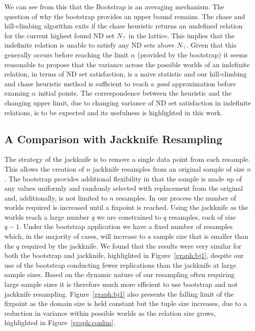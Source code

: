 We can see from this that the Bootstrap is an averaging mechanism.
The question of why the bootstrap provides an upper bound remains.
The chase and hill-climbing algorithm exits if the chase heuristic
returns an undefined relation for the current highest found ND set
$N_{\top}$ in
the lattice. This implies that the indefinite relation is unable to
satisfy any ND sets above $N_{\top}$. Given that this generally occurs
before reaching the limit $\alpha$ (provided by the bootstrap) it
seems reasonable to propose that the variance across the possible
worlds of an indefinite relation, in terms of ND set satisfaction,
is a naive statistic and our hill-climbing and chase heuristic method
is sufficient to reach a {\em good} approximation before examing
$\alpha$ initial points.  The correspondence between the heuristic and
the changing upper limit, due to changing variance of ND set
satisfaction in indefinite relations, is to be expected and its usefulness
is highlighted in this work.


\subsection{A Comparison with Jackknife
Resampling}\label{subsec:cp_jackcomparison}  


The strategy of the jackknife is to remove a single data point from each
resample. This allows the creation of $n$ jackknife resamples from an
original sample of size $n$.  The bootstrap provides additional flexibility
in that the sample is made up of any values uniformly and randomly selected
with replacement from the original and, additionally, is not limited to
$n$ resamples.  In our process the number of worlds required is increased
until a fixpoint is reached. Using the jackknife as the worlds reach a
large number $q$ we are constrained to $q$ resamples, each of size $q-1$.
Under the bootstrap application we have a fixed number of resamples which,
in the majority of cases,
will increase to a sample size that is smaller than the $q$ required by the 
jackknife. We found
that the results were very similar for both the bootstrap and jackknife, 
highlighted in Figure~\ref{graph:bj1}, 
despite our use of the bootstrap conducting fewer replications than the
jackknife at large sample sizes. Based on the dynamic nature of our
resampling often requiring large sample sizes it is therefore much
more efficient to use bootstrap and not jackknife resampling. 
Figure~\ref{graph:bj1} also presents
the falling limit of the fixpoint as the domain size is held constant but
the tuple size increases, due to a reduction in variance within
possible worlds as the relation size grows, highlighted in
Figure~\ref{graph:conlim}.


